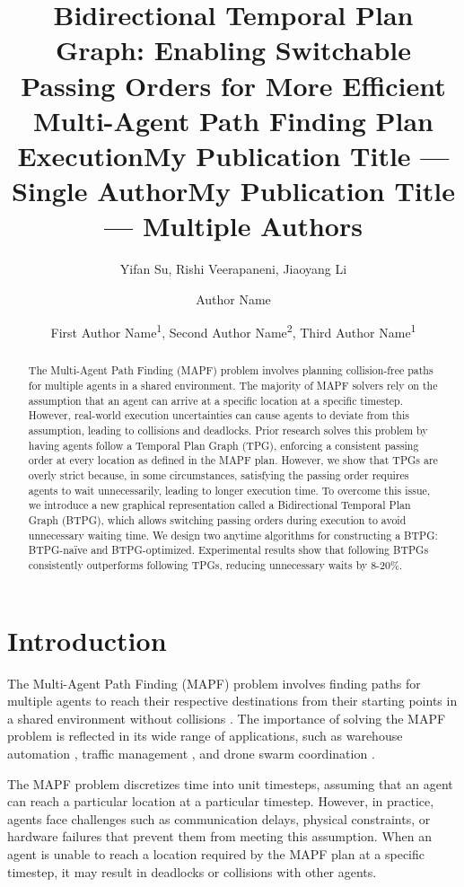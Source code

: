 \documentclass[letterpaper]{article} %
\title{Bidirectional Temporal Plan Graph: Enabling Switchable Passing Orders for More Efficient Multi-Agent Path Finding Plan Execution}
\author{
    Yifan Su, Rishi Veerapaneni, Jiaoyang Li
}
\title{My Publication Title --- Single Author}
\author {
    Author Name
}
\title{My Publication Title --- Multiple Authors}
\author {
    First Author Name\textsuperscript{\rm 1},
    Second Author Name\textsuperscript{\rm 2},
    Third Author Name\textsuperscript{\rm 1}
}
\theoremstyle{definition}
\begin{document}
\maketitle

\begin{abstract}
The Multi-Agent Path Finding (MAPF) problem involves planning collision-free paths for multiple agents in a shared environment. The majority of MAPF solvers rely on the assumption that an agent can arrive at a specific location at a specific timestep. However, real-world execution uncertainties can cause agents to deviate from this assumption, leading to collisions and deadlocks. Prior research solves this problem by having agents follow a Temporal Plan Graph (TPG), enforcing a consistent passing order at every location as defined in the MAPF plan. However, we show that TPGs are overly strict because, in some circumstances, satisfying the passing order requires agents to wait unnecessarily, leading to longer execution time. To overcome this issue, we introduce a new graphical representation called a Bidirectional Temporal Plan Graph (BTPG), which allows switching passing orders during execution to avoid unnecessary waiting time. We design two anytime algorithms for constructing a BTPG: BTPG-naïve and BTPG-optimized. Experimental results show that following BTPGs consistently outperforms following TPGs, reducing unnecessary waits by 8-20\%.
\end{abstract}

\section{Introduction}
The Multi-Agent Path Finding (MAPF) problem involves finding paths for multiple agents to reach their respective destinations from their starting points in a shared environment without collisions \cite{stern_multi-agent_2021}.
The importance of solving the MAPF problem is reflected in its wide range of applications, such as warehouse automation \cite{varambally_which_2022}, traffic management \cite{li_scalable_2021}, and drone swarm coordination \cite{honig_trajectory_2018}.

The MAPF problem discretizes time into unit timesteps, assuming that an agent can reach a particular location at a particular timestep. However, in practice, agents face challenges such as communication delays, physical constraints, or hardware failures that prevent them from meeting this assumption. When an agent is unable to reach a location required by the MAPF plan at a specific timestep, it may result in deadlocks or collisions with other agents.
\end{document}
